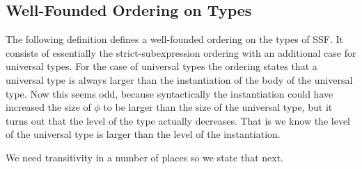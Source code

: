 \subsection{Well-Founded Ordering on Types}
\label{subsec:well-founded_ordering_on_types_ssf}
The following definition defines a well-founded ordering on the types
of SSF.  It consists of essentially the strict-subexpression ordering
with an additional case for universal types.  For the case of
universal types the ordering states that a universal type is always
larger than the instantiation of the body of the universal type.  Now
this seems odd, because syntactically the instantiation could have
increased the size of $\phi$ to be larger than the size of the
universal type, but it turns out that the level of the
type actually decreases.  That is we know the level of the universal
type is larger than the level of the instantiation.

\noindent
We need transitivity in a number of places so we state that next.

